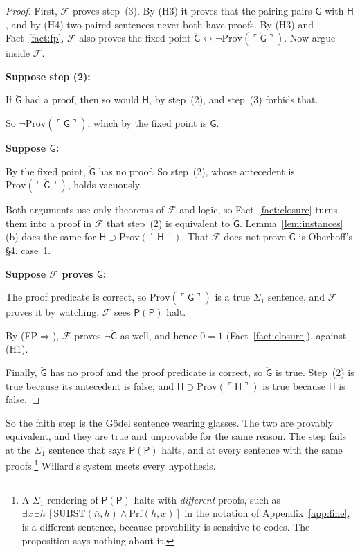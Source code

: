 \documentclass[11pt]{article}
\newcommand{\F}{\mathcal{F}}
\newcommand{\G}{\ddot{\mathsf{G}}}          %
\newcommand{\Hs}{\mathsf{H}}                %
\newcommand{\Prog}[1]{\mathsf{#1}}
\newcommand{\fs}[1]{\ifmmode\text{\guillemotleft#1\guillemotright}\else\guillemotleft#1\guillemotright\fi}
\newcommand{\contra}{~\text{\Lightning}}  %
\newcommand{\Prov}{\mathrm{Prov}}
\newcommand{\Prf}{\mathrm{Prf}}
\newcommand{\Subst}{\mathrm{SUBST}}
\newcommand{\gn}[1]{\ulcorner #1\urcorner}  %
\newcommand{\Case}[1]{\par\smallskip\noindent\hspace*{1em}\textbf{#1}\par}
\theoremstyle{plain}
\theoremstyle{definition}
\begin{document}
\begin{proof}
First, $\F$ proves step~(3). By (H3) it proves that the pairing pairs $\G$
with $\Hs$, and by (H4) two paired sentences never both have proofs. By (H3)
and Fact~\ref{fact:fp}, $\F$ also proves the fixed point
$\G \leftrightarrow \neg\Prov(\gn{\G})$. Now argue inside $\F$.

\Case{Suppose step (2):}
\begin{steps}
\item If $\G$ had a proof, then so would $\Hs$, by step~(2), and step~(3)
  forbids that.
\item So $\neg\Prov(\gn{\G})$, which by the fixed point is $\G$.
\end{steps}
\Case{Suppose $\G$:}
\begin{steps}
\item By the fixed point, $\G$ has no proof. So step~(2), whose antecedent is
  $\Prov(\gn{\G})$, holds vacuously.
\end{steps}

\smallskip\noindent
Both arguments use only theorems of $\F$ and logic, so
Fact~\ref{fact:closure} turns them into a proof in $\F$ that step~(2) is
equivalent to $\G$. Lemma~\ref{lem:instances}(b) does the same for
$\Hs \supset \Prov(\gn{\Hs})$. That $\F$ does not prove $\G$ is Oberhoff's
\S4, case~1.

\Case{Suppose $\F$ proves $\G$:}
\begin{steps}
\item The proof predicate is correct, so $\Prov(\gn{\G})$ is a true $\Sigma_1$
  sentence, and $\F$ proves it by watching. $\F$ sees $\Prog{P}(\Prog{P})$
  halt.
\item By (FP$\Rightarrow$), $\F$ proves $\neg\G$ as well, and hence $0 = 1$
  (Fact~\ref{fact:closure}), against (H1).\contra
\end{steps}

\smallskip\noindent
Finally, $\G$ has no proof and the proof predicate is correct, so $\G$ is
true. Step~(2) is true because its antecedent is false, and
$\Hs \supset \Prov(\gn{\Hs})$ is true because $\Hs$ is false.
\end{proof}

\noindent
So the faith step is the Gödel sentence wearing glasses. The two are provably
equivalent, and they are true and unprovable for the same reason. The step
fails at the $\Sigma_1$ sentence that says $\Prog{P}(\Prog{P})$ halts, and at
every sentence with the same proofs.\footnote{A $\Sigma_1$ rendering of
\fs{$\Prog{P}(\Prog{P})$ halts} with \emph{different} proofs, such as
$\exists x\,\exists h\,[\Subst(\bar n, h) \wedge \Prf(h, x)]$ in the notation
of Appendix~\ref{app:fine}, is a different sentence, because provability is
sensitive to codes. The proposition says nothing about it.} Willard's system
meets every hypothesis.
\end{document}
